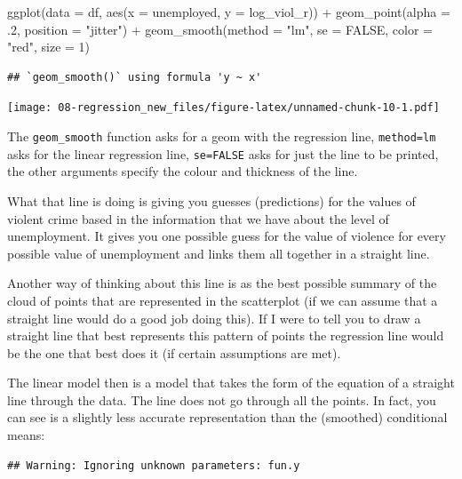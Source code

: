 \documentclass[
]{book}
\newenvironment{Shaded}{\begin{snugshade}}{\end{snugshade}}
\newcommand{\AttributeTok}[1]{\textcolor[rgb]{0.77,0.63,0.00}{#1}}
\newcommand{\ConstantTok}[1]{\textcolor[rgb]{0.00,0.00,0.00}{#1}}
\newcommand{\DecValTok}[1]{\textcolor[rgb]{0.00,0.00,0.81}{#1}}
\newcommand{\FunctionTok}[1]{\textcolor[rgb]{0.00,0.00,0.00}{#1}}
\newcommand{\NormalTok}[1]{#1}
\newcommand{\SpecialCharTok}[1]{\textcolor[rgb]{0.00,0.00,0.00}{#1}}
\newcommand{\StringTok}[1]{\textcolor[rgb]{0.31,0.60,0.02}{#1}}
\begin{document}
\begin{Shaded}
\begin{Highlighting}[]
\FunctionTok{ggplot}\NormalTok{(}\AttributeTok{data =}\NormalTok{ df, }\FunctionTok{aes}\NormalTok{(}\AttributeTok{x =}\NormalTok{ unemployed, }\AttributeTok{y =}\NormalTok{ log\_viol\_r)) }\SpecialCharTok{+}
  \FunctionTok{geom\_point}\NormalTok{(}\AttributeTok{alpha =}\NormalTok{ .}\DecValTok{2}\NormalTok{, }\AttributeTok{position =} \StringTok{"jitter"}\NormalTok{) }\SpecialCharTok{+}
  \FunctionTok{geom\_smooth}\NormalTok{(}\AttributeTok{method =} \StringTok{"lm"}\NormalTok{, }\AttributeTok{se =} \ConstantTok{FALSE}\NormalTok{, }\AttributeTok{color =} \StringTok{"red"}\NormalTok{, }\AttributeTok{size =} \DecValTok{1}\NormalTok{) }
\end{Highlighting}
\end{Shaded}

\begin{verbatim}
## `geom_smooth()` using formula 'y ~ x'
\end{verbatim}

\texttt{[image: 08-regression\_new\_files/figure-latex/unnamed-chunk-10-1.pdf]}

The \texttt{geom\_smooth} function asks for a geom with the regression line, \texttt{method=lm} asks for the linear regression line, \texttt{se=FALSE} asks for just the line to be printed, the other arguments specify the colour and thickness of the line.

What that line is doing is giving you guesses (predictions) for the values of violent crime based in the information that we have about the level of unemployment. It gives you one possible guess for the value of violence for every possible value of unemployment and links them all together in a straight line.

Another way of thinking about this line is as the best possible summary of the cloud of points that are represented in the scatterplot (if we can assume that a straight line would do a good job doing this). If I were to tell you to draw a straight line that best represents this pattern of points the regression line would be the one that best does it (if certain assumptions are met).

The linear model then is a model that takes the form of the equation of a straight line through the data. The line does not go through all the points. In fact, you can see is a slightly less accurate representation than the (smoothed) conditional means:

\begin{verbatim}
## Warning: Ignoring unknown parameters: fun.y
\end{verbatim}
\end{document}
